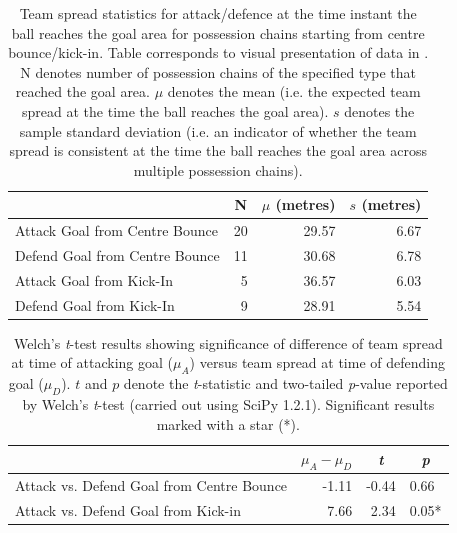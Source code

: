 
\begin{table}[htpb]
\caption{Team spread statistics for attack/defence at the time instant the ball reaches the goal area for possession chains starting from centre bounce/kick-in. Table corresponds to visual presentation of data in . N denotes number of possession chains of the specified type that reached the goal area. $\mu$ denotes the mean (i.e. the expected team spread at the time the ball reaches the goal area). $s$ denotes the sample standard deviation (i.e. an indicator of whether the team spread is consistent at the time the ball reaches the goal area across multiple possession chains).}
\label{tab:spread-groups}
\begin{tabular}{lrrr}
\toprule
                & \multicolumn{1}{c}{N}  & \multicolumn{1}{c}{$\mu$ (metres)}      & \multicolumn{1}{c}{$s$ (metres)}      \\
\midrule
Attack Goal from Centre Bounce & 20 & 29.57 & 6.67 \\
Defend Goal from Centre Bounce & 11 & 30.68 & 6.78 \\
Attack Goal from Kick-In & 5  & 36.57 & 6.03 \\
Defend Goal from Kick-In & 9  & 28.91 & 5.54 \\
\bottomrule
\end{tabular}
\end{table}

\begin{table}[htpb]
\caption{Welch's \textit{t}-test results showing significance of difference of team spread at time of attacking goal ($\mu_{A}$) versus team spread at time of defending goal ($\mu_{D}$). $t$ and $p$ denote the \textit{t}-statistic and two-tailed \textit{p}-value reported by Welch's \textit{t}-test (carried out using SciPy 1.2.1). Significant results marked with a star (*).}
\label{tab:ttest-details}
\begin{tabular}{lrrl}
\toprule
                                  & $\mu_{A} - \mu_{D}$      & \multicolumn{1}{c}{\textit{t}} & \multicolumn{1}{c}{\textit{p}} \\
\midrule
Attack vs. Defend Goal from Centre Bounce & -1.11 & -0.44    & 0.66  \\
Attack vs. Defend Goal from Kick-in       & 7.66  & 2.34     & 0.05*  \\ %
\bottomrule
\end{tabular}
\end{table}

